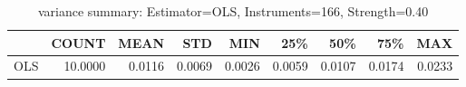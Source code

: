 \begin{table}[ht]
\centering
\caption{variance summary: Estimator=OLS, Instruments=166, Strength=0.40}
\begin{tabular}{lrrrrrrrr}
\toprule
 & COUNT & MEAN & STD & MIN & 25\% & 50\% & 75\% & MAX \\
\midrule
OLS & 10.0000 & 0.0116 & 0.0069 & 0.0026 & 0.0059 & 0.0107 & 0.0174 & 0.0233 \\
\bottomrule
\end{tabular}
\end{table}
